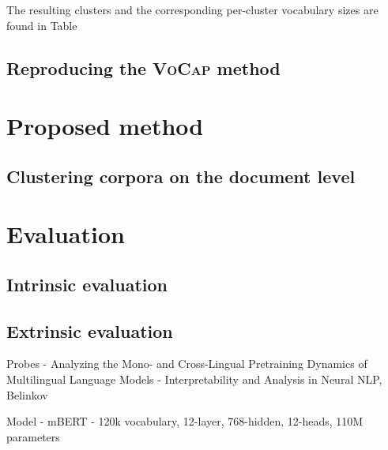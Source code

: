 The resulting clusters and the corresponding per-cluster vocabulary sizes are found in Table 

\subsection{Reproducing the \textsc{VoCap} method}



\section{Proposed method}

\subsection{Clustering corpora on the document level}

\section{Evaluation}

\subsection{Intrinsic evaluation}

\subsection{Extrinsic evaluation}


Probes
- Analyzing the Mono- and Cross-Lingual Pretraining Dynamics of Multilingual Language Models
- Interpretability and Analysis in Neural NLP, Belinkov

Model
- mBERT - 120k vocabulary, 12-layer, 768-hidden, 12-heads, 110M parameters